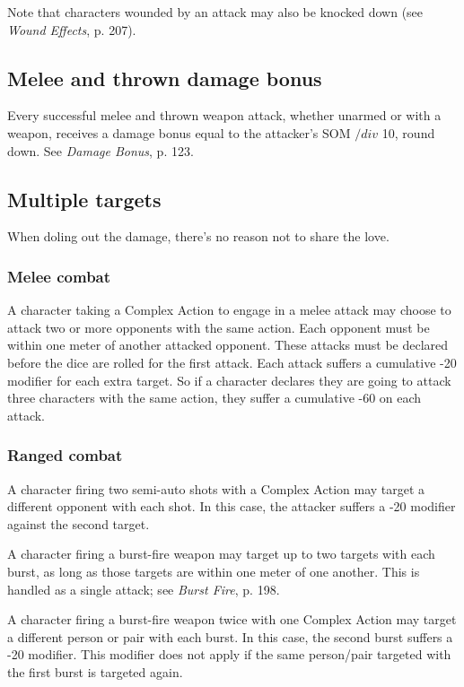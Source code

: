 Note that characters wounded by an attack may also be knocked down (see \emph{Wound Effects}, p. 207). 



\subsection{Melee and thrown damage bonus} \label{sec:melee-thrown-damage-bonus} 

Every successful melee and thrown weapon attack, whether unarmed or with a weapon, receives a damage bonus equal to the attacker’s SOM $/div$ 10, round down. See \emph{Damage Bonus}, p. 123. 



\subsection{Multiple targets} \label{sec:multiple-targets} 

When doling out the damage, there’s no reason not to share the love. 

\subsubsection{Melee combat} 

A character taking a Complex Action to engage in a melee attack may choose to attack two or more opponents with the same action. Each opponent must be within one meter of another attacked opponent. These attacks must be declared before the dice are rolled for the first attack. Each attack suffers a cumulative -20 modifier for each extra target. So if a character declares they are going to attack three characters with the same action, they suffer a cumulative -60 on each attack. 

\subsubsection{Ranged combat} 

A character firing two semi-auto shots with a Complex Action may target a different opponent with each shot. In this case, the attacker suffers a -20 modifier against the second target. 

A character firing a burst-fire weapon may target up to two targets with each burst, as long as those targets are within one meter of one another. This is handled as a single attack; see \emph{Burst Fire}, p. 198. 

A character firing a burst-fire weapon twice with one Complex Action may target a different person or pair with each burst. In this case, the second burst suffers a -20 modifier. This modifier does not apply if the same person/pair targeted with the first burst is targeted again. 

